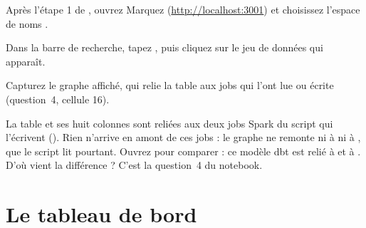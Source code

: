 \begin{obtenir}
  \item Après l'étape 1 de , ouvrez Marquez (\url{http://localhost:3001}) et choisissez l'espace de noms .
  \item Dans la barre de recherche, tapez , puis cliquez sur le jeu de données qui apparaît.
  \item Capturez le graphe affiché, qui relie la table aux jobs qui l'ont lue ou écrite (question~4, cellule 16).
\end{obtenir}
\begin{lecture}
La table  et ses huit colonnes sont reliées aux deux jobs Spark du script
 qui l'écrivent (). Rien n'arrive en amont de ces
jobs : le graphe ne remonte ni à  ni à , que le script
lit pourtant. Ouvrez  pour comparer : ce modèle dbt est relié à  et à
. D'où vient la différence ? C'est la question~4 du notebook.
\end{lecture}


\section{Le tableau de bord}\label{c5:sec:dashboard}

